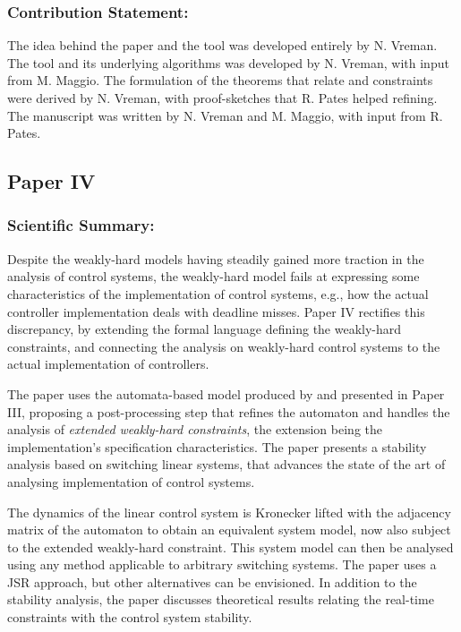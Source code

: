 \subsubsection*{Contribution Statement:}%
%
The idea behind the paper and the tool was developed entirely by N. Vreman. 
The tool and its underlying algorithms was developed by N. Vreman, with input from M. Maggio.
The formulation of the theorems that relate \tAH{} and \tRH{} constraints were derived by N. Vreman, with proof-sketches that R. Pates helped refining.
The manuscript was written by N. Vreman and M. Maggio, with input from R. Pates.


\subsection*{Paper IV}%
%
\begin{quote}
\end{quote}

\subsubsection*{Scientific Summary:}%
%
Despite the weakly-hard models having steadily gained more traction in the analysis of control systems, the weakly-hard model fails at expressing some characteristics of the implementation of control systems, e.g., how the actual controller implementation deals with deadline misses.
Paper IV rectifies this discrepancy, by extending the formal language defining the weakly-hard constraints, and connecting the analysis on weakly-hard control systems to the actual implementation of controllers.

The paper uses the automata-based model produced by \tool{} and presented in Paper III, proposing a post-processing step that refines the automaton and handles the analysis of \emph{extended weakly-hard constraints}, the extension being the implementation's specification characteristics.
The paper presents a stability analysis based on switching linear systems, that advances the state of the art of analysing implementation of control systems.

The dynamics of the linear control system is Kronecker lifted with the adjacency matrix of the automaton to obtain an equivalent system model, now also subject to the extended weakly-hard constraint.
This system model can then be analysed using any method applicable to arbitrary switching systems.
The paper uses a JSR approach, but other alternatives can be envisioned.
In addition to the stability analysis, the paper discusses theoretical results relating the real-time constraints with the control system stability.

